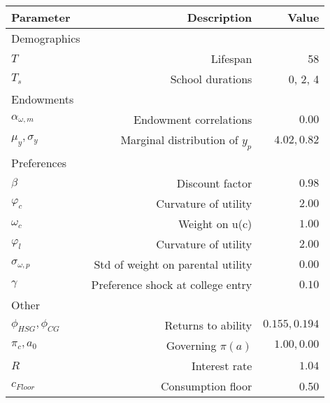 \begin{tabular}{lrr}
\hline
Parameter & Description  & Value  \\
\hline
Demographics &   &   \\
$T$ & Lifespan  & 58  \\
$T_{s}$ & School durations  & 0, 2, 4  \\
Endowments &   &   \\
$\alpha_{\omega,m}$ & Endowment correlations  & $0.00$  \\
$\mu_{y}, \sigma_{y}$ & Marginal distribution of $y_{p}$  & $4.02, 0.82$  \\
Preferences &   &   \\
$\beta$ & Discount factor  & $0.98$  \\
$\varphi_{c}$ & Curvature of utility  & $2.00$  \\
$\omega_{c}$ & Weight on u(c)  & $1.00$  \\
$\varphi_{l}$ & Curvature of utility  & $2.00$  \\
$\sigma_{\omega,p}$ & Std of weight on parental utility  & $0.00$  \\
$\gamma$ & Preference shock at college entry  & $0.10$  \\
Other &   &   \\
$\phi_{HSG}, \phi_{CG}$ & Returns to ability  & $0.155, 0.194$  \\
$\pi_{c}, a_{0}$ & Governing $\pi(a)$  & $1.00, 0.00$  \\
$R$ & Interest rate  & $1.04$  \\
$c_{Floor}$ & Consumption floor  & 0.50  \\
\hline
\end{tabular}%
